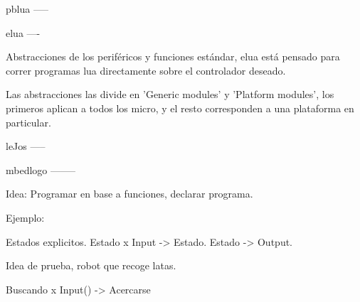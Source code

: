 
pblua
-----

elua
----

Abstracciones de los periféricos y funciones estándar, elua está pensado para
correr programas lua directamente sobre el controlador deseado.

Las abstracciones las divide en 'Generic modules' y 'Platform modules', los primeros
aplican a todos los micro, y el resto corresponden a una plataforma en particular.




leJos
-----

mbedlogo
--------


Idea:
Programar en base a funciones, declarar programa.

Ejemplo:

Estados explicitos.
Estado x Input -> Estado.
Estado -> Output.

Idea de prueba, robot que recoge latas.

Buscando x Input() -> Acercarse




